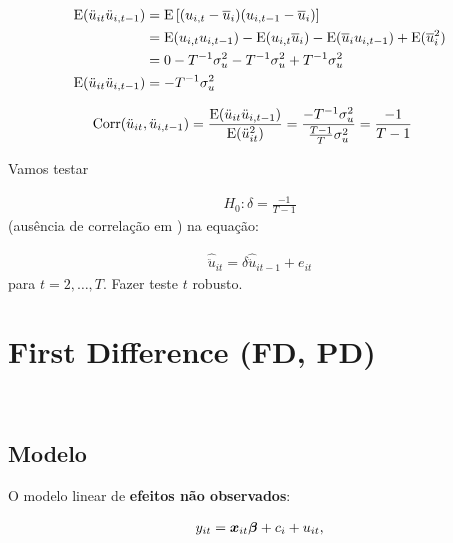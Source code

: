 \documentclass[11pt, oneside, a4paper, article]{article}
\numberwithin{equation}{section}
\begin{document}
\vspace{-1 em} 
\begin{align*}
	\text{E}( \ddot{u}_{it} \ddot{u}_{i,t-1} ) &=
	\text{E}\left[ ( u_{i,t} - \overline{u}_{i} ) ( u_{i,t-1} - \overline{u}_{i} ) \right]
	\\
	&=
	\text{E}( u_{i,t} u_{i,t-1} ) - 
	\text{E}( u_{i,t} \overline{u}_{i} ) -
	\text{E}( \overline{u}_{i} u_{i,t-1} ) +
	\text{E}( \overline{u}^2_{i} )
	\\
	&=
	0 - T^{-1} \sigma^2_{u} - T^{-1} \sigma^2_{u} + T^{-1} \sigma^2_{u}
	\\
	\text{E}( \ddot{u}_{it} \ddot{u}_{i,t-1} ) 
	&= -T^{-1} \sigma_{u}^2
\end{align*}

\vspace{-1 em} 
\begin{align*}
	\text{Corr}( \ddot{u}_{it}, \ddot{u}_{i,t-1} ) &=
	\frac{\text{E}( \ddot{u}_{it} \ddot{u}_{i,t-1} )}{\text{E}( \ddot{u}_{it}^2 )} =
	\frac{-T^{-1} \sigma_{u}^2}{\frac{T-1}{T}\sigma^2_{u}} = 
	\frac{-1}{T-1}
\end{align*}

Vamos testar 

\vspace{-1 em} 
\begin{align*}
	H_{0}: \delta = \frac{-1}{T-1}
\end{align*}
(ausência de correlação em \red{$\uvec$}) na equação:

\vspace{-1 em} 
\begin{align*}
	\widehat{\ddot{u}}_{it} = \delta \widehat{\ddot{u}}_{it-1} + e_{it}
\end{align*}
para $t=2, \dots, T$.
Fazer teste $t$ robusto.

\clearpage
\section{First Difference (FD, PD)}
\noindent
\citet[Sec.10.6 -- First Difference Methods, p.279]{wool-2010} \\

\subsection{Modelo}

O modelo linear de \textbf{efeitos não observados}:

\vspace{-1 em}
\begin{align} \label{mod1:FD}
	y_{it} = \boldsymbol{x}_{it} \boldsymbol{\beta} + c_{i} + u_{it},
\end{align}
\end{document}
